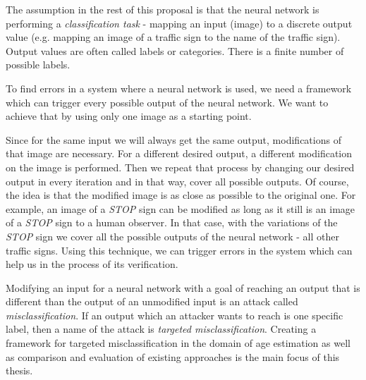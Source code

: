 The assumption in the rest of this proposal is that the neural network is performing a \textit{classification task} - mapping an input (image) to a discrete output value (e.g. mapping an image of a traffic sign to the name of the traffic sign).  Output values are often called labels or categories. There is a finite number of possible labels.

To find errors in a system where a neural network is used, we need a framework which can trigger every possible output of the neural network.  We want to achieve that by using only one image as a starting point. 

Since for the same input we will always get the same output, modifications of that image are necessary. For a different desired output, a different modification on the image is performed.
Then we repeat that process by changing our desired output in every iteration and in that way, cover all possible outputs. Of course, the idea is that the modified image is as close as possible to the original one. For example, an image of a  \textit{STOP} sign can be modified as long as it still is an image of a  \textit{STOP} sign to a human observer. In that case, with the variations of the \textit{STOP} sign we cover all the possible outputs of the neural network - all other traffic signs. Using this technique, we can trigger errors in the system which can help us in the process of its verification. 

Modifying an input for a neural network with a goal of reaching an output that is different than the output of an unmodified input is an attack called \textit{misclassification}. If an output which an attacker wants to reach is one specific label, then a name of the attack is \textit{targeted misclassification}. Creating a framework for targeted misclassification in the domain of age estimation as well as comparison and evaluation of existing approaches is the main focus of this thesis.